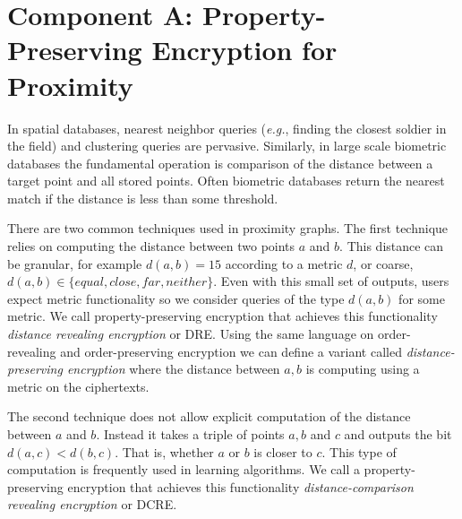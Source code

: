 
\section{Component A:  Property-Preserving Encryption for Proximity}

In spatial databases, nearest neighbor queries (\emph{e.g.}, finding the closest soldier in the field) and clustering queries are pervasive.  %
Similarly, in large scale biometric databases the fundamental operation is comparison of the distance between a target point and all stored points. Often biometric databases return the nearest match if the distance is less than some threshold.    %

There are two common techniques used in proximity graphs.  The first technique relies on computing the distance between two points $a$ and $b$.  This distance can be granular, for example $d(a, b) =15$ according to a metric $d$, or coarse, $d(a,b)\in\{equal,close,far,neither\}$.  Even with this small set of outputs, users expect metric functionality so we consider queries of the type $d(a,b)$ for some metric.  We call property-preserving encryption that achieves this functionality \emph{distance revealing encryption} or DRE.  Using the same language on order-revealing and order-preserving encryption we can define a variant called \emph{distance-preserving encryption} where the distance between $a,b$ is computing using a metric on the ciphertexts.

The second technique does not allow explicit computation of the distance between $a$ and $b$.  Instead it takes a triple of points $a,b$ and $c$ and outputs the bit $d(a,c)<d(b,c)$.  That is, whether $a$ or $b$ is closer to $c$.  This type of computation is frequently used in learning algorithms.    We call a property-preserving encryption that achieves this functionality \emph{distance-comparison revealing encryption} or DCRE.

